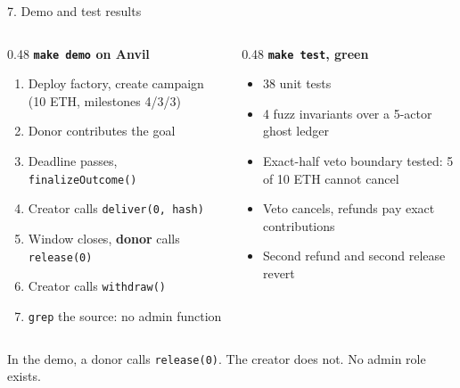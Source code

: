 \documentclass[aspectratio=169,10pt]{beamer}
\begin{document}
\begin{frame}{7. Demo and test results}
\begin{columns}[T,onlytextwidth]
  \begin{column}{0.48\textwidth}
    \small\textbf{\texttt{make demo} on Anvil}
    \begin{enumerate}
      \item Deploy factory, create campaign (10 ETH, milestones 4/3/3)
      \item Donor contributes the goal
      \item Deadline passes, \texttt{finalizeOutcome()}
      \item Creator calls \texttt{deliver(0, hash)}
      \item Window closes, \textbf{donor} calls \texttt{release(0)}
      \item Creator calls \texttt{withdraw()}
      \item \texttt{grep} the source: no admin function
    \end{enumerate}
  \end{column}
  \begin{column}{0.48\textwidth}
    \small\textbf{\texttt{make test}, green}
    \begin{itemize}
      \item 38 unit tests
      \item 4 fuzz invariants over a 5-actor ghost ledger
      \item Exact-half veto boundary tested: 5 of 10 ETH cannot cancel
      \item Veto cancels, refunds pay exact contributions
      \item Second refund and second release revert
    \end{itemize}
  \end{column}
\end{columns}

\vspace{0.4em}
\small In the demo, a donor calls \texttt{release(0)}. The creator does not. No admin role exists.
\end{frame}
\end{document}
